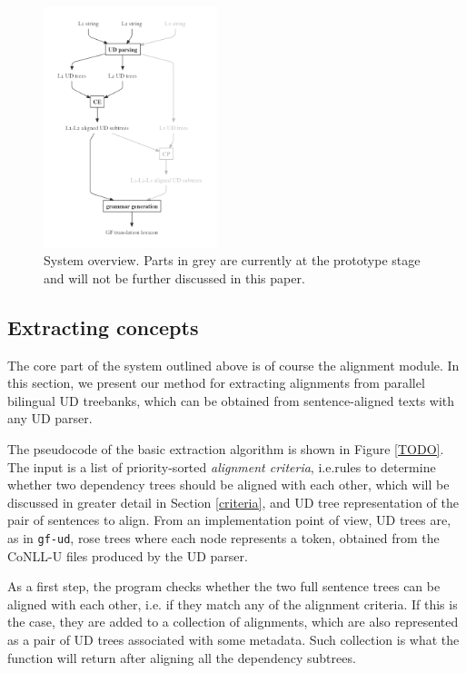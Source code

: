 \documentclass[11pt]{article}
\begin{document}
\begin{figure}[h]
  \centering
  \includegraphics[width=0.45\textwidth]{figures/overview.png}
  \caption[System overview]{System overview. Parts in grey are currently at the prototype stage and will not be further discussed in this paper.} \label{elems}
  \label{overview}
\end{figure}

\subsection{Extracting concepts} 
The core part of the system outlined above is of course the alignment module. In this section, we present our method for extracting alignments from parallel bilingual UD treebanks, which can be obtained from sentence-aligned texts with any UD parser.

The pseudocode of the basic extraction algorithm is shown in Figure \ref{TODO}.
The input is a list of priority-sorted \textit{alignment criteria}, i.e.rules to determine whether two dependency trees should be aligned with each other, which will be discussed in greater detail in Section \ref{criteria}, and UD tree representation of the pair of sentences to align.
From an implementation point of view, UD trees are, as in \texttt{gf-ud}, rose trees where each node represents a token, obtained from the CoNLL-U files produced by the UD parser.


As a first step, the program checks whether the two full sentence trees can be aligned with each other, i.e. if they match any of the alignment criteria. 
If this is the case, they are added to a collection of alignments, which are also represented as a pair of UD trees associated with some metadata. 
Such collection is what the function will return after aligning all the dependency subtrees. %
\end{document}
